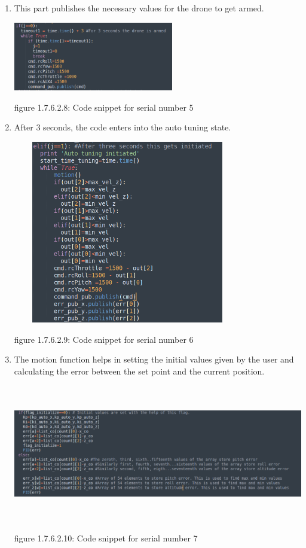 \documentclass[a4paper,12pt,oneside]{book}
\begin{document}
\begin{enumerate}
\item This part publishes the necessary values for the drone to get armed.


\includegraphics[width = 7cm , height= 3cm]{Arm_4.png}
\begin{center}
    figure 1.7.6.2.8: Code snippet for serial number 5
\end{center}

\item After 3 seconds, the code enters into the auto tuning state.

\includegraphics[width = 10cm , height= 8cm]{Auto_init_6.png}
\begin{center}
    figure 1.7.6.2.9: Code snippet for serial number 6
\end{center}

\item The motion function helps in setting the initial values given by the user and calculating the error between the set point and the current position.

\includegraphics[width = 14cm , height= 6cm]{motion_fn_7.png}
\begin{center}
    figure 1.7.6.2.10: Code snippet for serial number 7
\end{center}



\end{enumerate}
\end{document}
